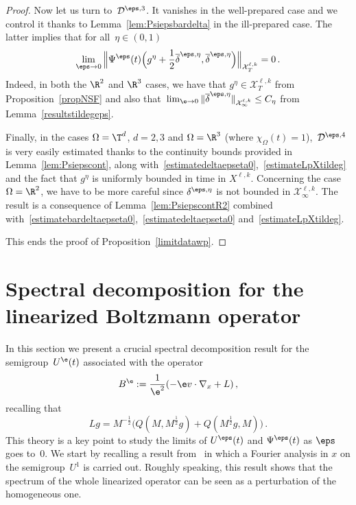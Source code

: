\begin{proof}


Now let us turn to~$ {\mathcal D} ^{\eps,3}$. It vanishes in the well-prepared case and we control it thanks to Lemma~\ref{lem:Psiepsbardelta} in the ill-prepared case. The latter implies that for all~$\eta\in(0,1)$
\[
\lim_{\eps\to 0} \Big\|\Psi^\eps(t)\Big(g^\eta + \frac{1}{2} \overline\delta^{\eps,\eta},\overline\delta^{\eps,\eta}\Big)\Big\|_{\mathcal{X}^{\ell,k}_{T}} =0 \,.
\]
Indeed, in both the $\R^2$ and $\R^3$ cases, we have that $g^\eta \in \mathcal{X}^{\ell,k}_T$ from Proposition~\ref{propNSF} and also that~$\lim_{\e\to0} \|\overline\delta^{\eps,\eta}\|_{\mathcal{X}^{\ell,k}_\infty} \le C_\eta$ from Lemma~\ref{resultstildegeps}.

Finally, in the cases $\Omega=\T^d$, $d=2,3$ and $\Omega=\R^3$ (where $\chi_\Omega(t)=1$),~$ {\mathcal D} ^{\eps,4}$ is very easily estimated thanks to the continuity bounds provided in Lemma~\ref{lem:Psiepscont}, along with~\eqref{estimatedeltaepseta0},~\eqref{estimateLpXtildeg} and the fact that $g^\eta$ is uniformly bounded in time in $X^{\ell,k}$. Concerning the case $\Omega=\R^2$, we have to be more careful since $\delta^{\eps,\eta}$ is not bounded in $\mathcal{X}^{\ell,k}_\infty$. The result is a consequence of Lemma~\ref{lem:PsiepscontR2} combined with~\eqref{estimatebardeltaepseta0},~\eqref{estimatedeltaepseta0} and~\eqref{estimateLpXtildeg}.


This ends the proof of Proposition~\ref{limitdatawp}. 
\end{proof}%

\appendix
\section{Spectral decomposition for the linearized Boltzmann operator}\label{specBoltz}
In this section we present a crucial spectral decomposition result for the semigroup~$ U^\e(t)$ associated with the operator
\[
B^\e:=\frac{1}{\e^2}(-\e v \cdot \nabla_x +L)\,,
\]
recalling that
\[
Lg =M^{-\frac12}\big(
Q(M,M^\frac12 g) + Q(M^\frac12 g,M)\big)\,.
\]
This theory is a key point to study the limits of $U^\eps(t)$ and $\Psi^\eps(t)$ as $\eps$ goes to~$0$.
We start by recalling a result from~\cite{Ellis-Pinsky} in which a Fourier analysis in $x$ on the semigroup~$U^1$ is carried out. Roughly speaking, this result shows that the spectrum of the whole linearized operator can be seen as a perturbation of the homogeneous one.


